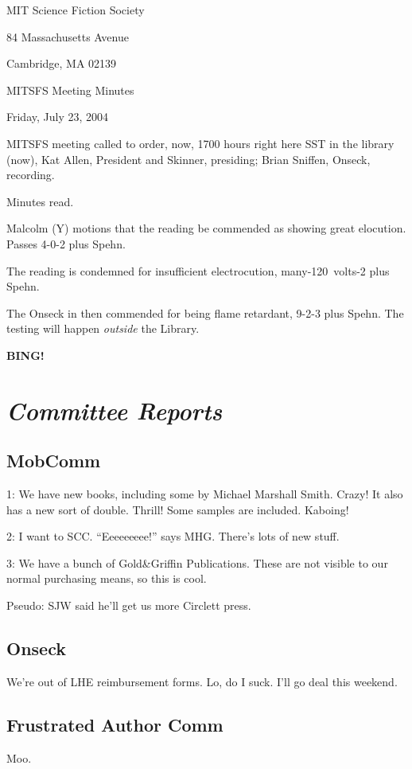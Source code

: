 \documentclass[10pt]{article}
\newcommand{\bing}{{\bf BING!} }
\newcommand{\goto}[1]{\bing \vskip 12pt \section*{{\em{#1}}}}
\newcommand{\ps}{ plus Spehn\xspace}
\begin{document}
\begin{center}

MIT Science Fiction Society 

84 Massachusetts Avenue

Cambridge, MA 02139

\vspace{12pt}

MITSFS Meeting Minutes 

Friday, July 23, 2004

\end{center}
 
\vspace{18pt}

\setlength{\parskip}{6pt}

\noindent
MITSFS meeting called to order, now, 1700 hours right here SST in the
library (now), Kat Allen, President and
Skinner, presiding; Brian Sniffen,  Onseck, recording.

Minutes read.

Malcolm (Y) motions that the reading be commended as showing great
elocution.  Passes 4-0-2\ps.

The reading is condemned for insufficient electrocution,
many-120~volts-2\ps.

The Onseck in then commended for being flame retardant, 9-2-3\ps.  The
testing will happen \emph{outside} the Library.

\goto{Committee Reports}
\subsection*{MobComm}
1: We have new books, including some by Michael Marshall Smith.  Crazy!  It also
has a new sort of double.  Thrill!  Some samples are included.  Kaboing!

2: I want to SCC.  ``Eeeeeeeee!'' says MHG.  There's lots of new stuff.

3: We have a bunch of Gold\&Griffin Publications.  These are not
visible to our normal purchasing means, so this is cool.

Pseudo: SJW said he'll get us more Circlett press.

\subsection*{Onseck}
We're out of LHE reimbursement forms.  Lo, do I suck.  I'll go deal
this weekend.

\subsection*{Frustrated Author Comm}
Moo.
\end{document}
